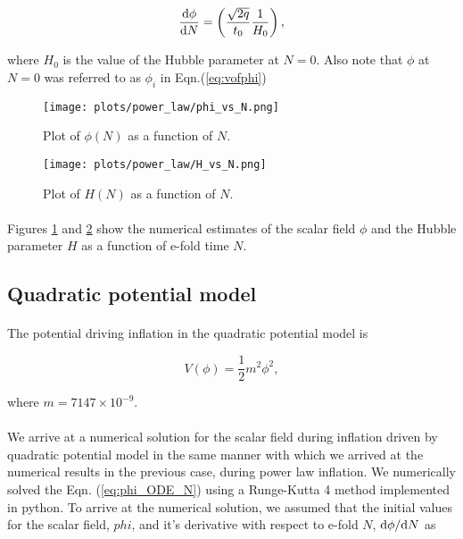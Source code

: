 \documentclass[12pt,a4paper,oneside]{book}
\begin{document}
\begin{equation}
\frac{{\rm d}\phi}{{\rm d}N} = \left(\frac{\sqrt{2q}}{t_0}\frac{1}{H_0}\right),
\end{equation}

\noindent where $H_0$ is the value of the Hubble parameter at $N=0$. 
Also note that $\phi$ at $N=0$ was referred to as $\phi_i$ in Eqn.(\ref{eq:vofphi})

\begin{figure}
\begin{center}
\texttt{[image: plots/power\_law/phi\_vs\_N.png]}
\caption[Plot of $\phi(N)$ as a function of $N$ in power law inflation.]
{Plot of $\phi(N)$ as a function of $N$.}
\label{fig:field_vs_N}
\end{center}
\end{figure}

\begin{figure}
\begin{center}
\texttt{[image: plots/power\_law/H\_vs\_N.png]}
\caption[Plot of $H(N)$ as a function of $N$ in power law inflation.]
{Plot of $H(N)$ as a function of $N$.}
\label{fig:Hubble_vs_N}
\end{center}
\end{figure}

\paragraph*{} Figures \ref{fig:field_vs_N} and \ref{fig:Hubble_vs_N} show the numerical estimates 
of the scalar field $\phi$ and the Hubble parameter $H$ as a function of e-fold time $N$.

\subsection{Quadratic potential model}

\paragraph*{} The potential driving inflation in the quadratic potential model is 

\begin{equation}\label{eq:vofphi_quad}
V(\phi) = \frac{1}{2}m^2\phi^2,
\end{equation}

\noindent where $m = 7147\times 10^{-9}$.

\paragraph*{} We arrive at a numerical solution for the scalar field during inflation driven 
by quadratic potential model in the same manner with which we arrived at the numerical results 
in the previous case, during power law inflation. We numerically solved the Eqn. (\ref{eq:phi_ODE_N}) 
using a Runge-Kutta 4 method implemented in python. To arrive at the numerical solution, we assumed 
that the initial values for the scalar field, $phi$, and it's derivative with respect to e-fold $N$, ${\rm d}\phi/{\rm d}N$ as 
\end{document}
